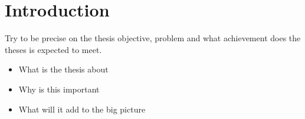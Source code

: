 \documentclass[11pt,twoside,openright,titlepage,
  headinclude,footinclude,BCOR=5mm,
  numbers=noenddot,cleardoublepage=empty,
  tablecaptionabove, dottedtoc,
  bibliography=totoc]{scrreprt}
\providecommand{\tightlist}{%
  \setlength{\itemsep}{0pt}\setlength{\parskip}{0pt}}
\begin{document}
\begingroup
\cleardoublepage
{}

\endgroup

\begingroup
\cleardoublepage
{}

\endgroup


\cleardoublepage
{}
{}
\setcounter{tocdepth}{2}
\begingroup 
  \let\clearpage\relax
  \let\cleardoublepage\relax
    \tableofcontents
\endgroup
\markboth{\spacedlowsmallcaps{\contentsname}}
{\spacedlowsmallcaps{\contentsname}} 

\begingroup
\cleardoublepage
\listoftables
\vfill
\let\clearpage\relax
\let\cleardoublepage\relax

\listoffigures
\vfill
\endgroup

\begingroup 
  \let\clearpage\relax
  \let\cleardoublepage\relax
\endgroup

\cleardoublepage



\hypertarget{introduction}{%
\chapter{Introduction}\label{introduction}}

Try to be precise on the thesis objective, problem and what achievement does the theses is expected to meet.

\begin{itemize}
\tightlist
\item
  What is the thesis about
\item
  Why is this important
\item
  What will it add to the big picture
\end{itemize}
\end{document}
